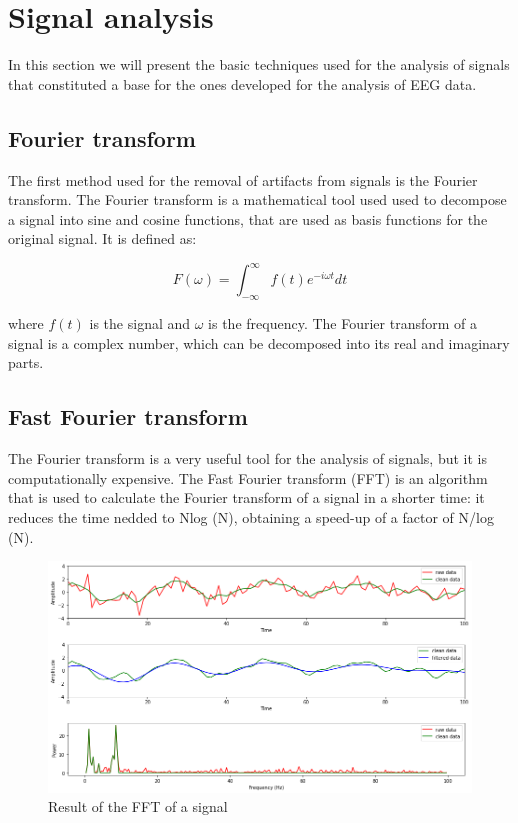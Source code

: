 \documentclass[a4paper]{sapthesis}
\begin{document}
\section{Signal analysis}
In this section we will present the basic techniques used for the analysis
of signals that 
constituted a base for the ones developed for the analysis of EEG data.
\subsection{Fourier transform}\label{sec:fourier}
The first method used for the removal of artifacts from signals is the
Fourier transform\cite{fourier}. The Fourier transform is a mathematical tool used
 used to decompose a signal into sine and cosine functions, that are 
used as basis functions for the original signal.
It is defined as:

\begin{equation}\label{eq:fourier}
F(\omega) = \int_{-\infty}^{\infty} f(t) e^{-i\omega t} dt
\end{equation}

where $f(t)$ is the signal and $\omega$ is the frequency. The Fourier
transform of a signal is a complex number, which can be decomposed into
its real and imaginary parts. 

\subsection{Fast Fourier transform}\label{sec:fft}
The Fourier transform is a very useful tool for the analysis of signals,
but it is computationally expensive. The Fast Fourier transform (FFT)\cite{fft} is
an algorithm that is used to calculate the Fourier transform
of a signal in a shorter time: it reduces the time nedded to Nlog (N),
 obtaining a speed-up of a factor of N/log (N).\newline
\begin{figure}[h!]
  \includegraphics[scale=0.45]{fft_waves_result}
  \centering
  \caption{Result of the FFT of a signal
  }\label{fig:fft}
  
  \end{figure}
\end{document}
